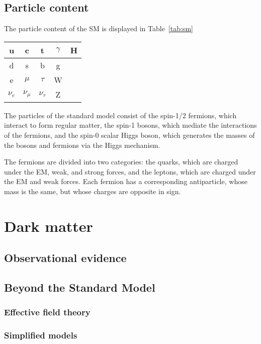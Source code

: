\subsection{Particle content}

The particle content of the SM is displayed in Table~\ref{tab:sm}

\begin{table*}[htbH]
\begin{center}
\begin{tabular}{| c | c | c | c | c |}
\hline
u & c & t & $\gamma$ & H \\
\hline
d & s & b & g & \\
\hline
e & $\mu$ & $\tau$ & W & \\
\hline
$\nu_e$ & $\nu_\mu$ & $\nu_\tau$ & Z & \\
\hline
\end{tabular}
\caption{The particles of the Standard Model.}\label{tab:sm}
\end{center}
\end{table*}

The particles of the standard model consist of the spin-1/2 fermions, which interact to form regular matter, the spin-1 bosons, which mediate the interactions of the fermions, and the spin-0 scalar Higgs boson, which generates the masses of the bosons and fermions via the Higgs mechanism. 

\indent The fermions are divided into two categories: the quarks, which are charged under the EM, weak, and strong forces, and the leptons, which are charged under the EM and weak forces. Each fermion has a corresponding antiparticle, whose mass is the same, but whose charges are opposite in sign. 


\section{Dark matter}

\subsection{Observational evidence}

\subsection{Beyond the Standard Model}

\subsubsection{Effective field theory}

\subsubsection{Simplified models}
